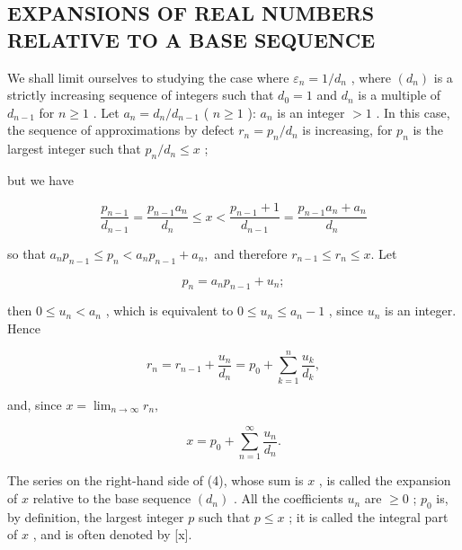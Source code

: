 \subsection{EXPANSIONS OF REAL NUMBERS RELATIVE TO A BASE SEQUENCE}

We shall limit ourselves to studying the case where \(\varepsilon_{n} = 1 / d_{n}\) , where \((d_n)\) is a strictly increasing sequence of integers such that \(d_0 = 1\) and \(d_n\) is a multiple of \(d_{n-1}\) for \(n \geqslant 1\) . Let \(a_n = d_n / d_{n-1}\) ( \(n \geqslant 1\) ): \(a_n\) is an integer \(>1\) . In this case, the sequence of approximations by defect \(r_n = p_n / d_n\) is increasing, for \(p_n\) is the largest integer such that \(p_n / d_n \leqslant x\) ;

but we have

\[
\frac {p _ {n - 1}}{d _ {n - 1}} = \frac {p _ {n - 1} a _ {n}}{d _ {n}} \leqslant x <   \frac {p _ {n - 1} + 1}{d _ {n - 1}} = \frac {p _ {n - 1} a _ {n} + a _ {n}}{d _ {n}}
\]

so that \(a_{n}p_{n - 1}\leqslant p_{n} <   a_{n}p_{n - 1} + a_{n},\) and therefore \(r_{n - 1}\leqslant r_n\leqslant x.\) Let

\[
p _ {n} = a _ {n} p _ {n - 1} + u _ {n};\tag{2}
\]

then \(0 \leqslant u_n < a_n\) , which is equivalent to \(0 \leqslant u_n \leqslant a_n - 1\) , since \(u_n\) is an integer. Hence

\[
r _ {n} = r _ {n - 1} + \frac {u _ {n}}{d _ {n}} = p _ {0} + \sum_ {k = 1} ^ {n} \frac {u _ {k}}{d _ {k}},\tag{3}
\]

and, since \(x = \lim_{n\to \infty}r_n,\)

\[
x = p _ {0} + \sum_ {n = 1} ^ {\infty} \frac {u _ {n}}{d _ {n}}.\tag{4}
\]

The series on the right-hand side of (4), whose sum is \(x\) , is called the expansion of \(x\) relative to the base sequence \((d_n)\) . All the coefficients \(u_n\) are \(\geqslant 0\) ; \(p_0\) is, by definition, the largest integer \(p\) such that \(p \leqslant x\) ; it is called the integral part of \(x\) , and is often denoted by {[}x{]}.

